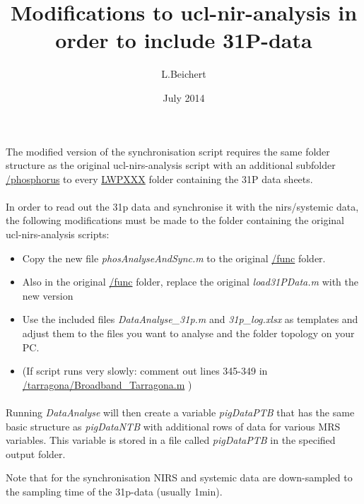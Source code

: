\documentclass[12pt]{article}
\title{Modifications to ucl-nir-analysis in order to include 31P-data}
\author{L.Beichert}
\date{July 2014}
\begin{document}
\maketitle

The modified version of the synchronisation script requires the same folder structure as the original ucl-nirs-analysis script with an additional subfolder \url{/phosphorus} to every \url{LWPXXX} folder containing the 31P data sheets. 



\paragraph{}
In order to read out the 31p data and synchronise it with the nirs/systemic data, the following modifications must be made to the folder containing the original ucl-nirs-analysis scripts:

\begin{itemize}
\item Copy the new file \emph{phosAnalyseAndSync.m} to the original \url{/func} folder.
\item Also in the original \url{/func} folder, replace the original \emph{load31PData.m} with the new version
\item Use the included files \emph{DataAnalyse\_31p.m} and \emph{31p\_log.xlsx} as templates and adjust them to the files you want to analyse and the folder topology on your PC.
\item (If script runs very slowly: comment out lines 345-349 in \url{/tarragona/Broadband_Tarragona.m} )
\end{itemize}

\paragraph*{}
Running \emph{DataAnalyse} will then create a variable \emph{pigDataPTB} that has the same basic structure as \emph{pigDataNTB} with additional rows of data for various MRS variables. 
This variable is stored in a file called \emph{pigDataPTB} in the specified output folder.

Note that for the synchronisation NIRS and systemic data are down-sampled to the sampling time of the 31p-data (usually 1min).
\end{document}
